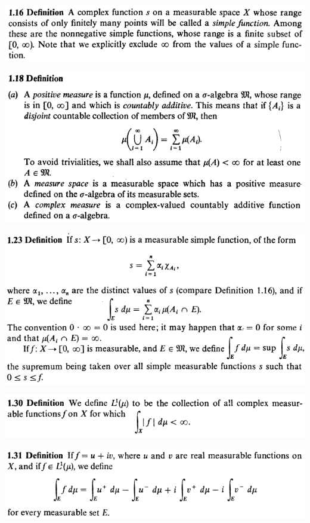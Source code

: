 \documentclass[12pt]{article}
\begin{document}
		\begin{center}
		\includegraphics{d1ponto16}
		\end{center}

		\begin{center}
		\includegraphics{d1ponto18}
		\end{center}

		\begin{center}
		\includegraphics{d1ponto23}
		\end{center}

		\begin{center}
		\includegraphics{d1ponto30}
		\end{center}

		\begin{center}
		\includegraphics{d1ponto31}
		\end{center}
\end{document}
